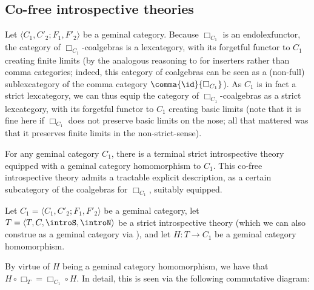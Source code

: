 
\subsection{Co-free introspective theories}

\begin{construction}\label{BoxCoalgebrasInGeminal}
Let $\langle C_1, C'_2; F_1, F'_2 \rangle$ be a geminal category. Because $\Box_{C_1}$ is an endolexfunctor, the category of $\Box_{C_1}$-coalgebras is a lexcategory, with its forgetful functor to $C_1$ creating finite limits (by the analogous reasoning to  for inserters rather than comma categories; indeed, this category of coalgebras can be seen as a (non-full) sublexcategory of the comma category $\comma{\id}{\Box_{C_1}}$). As $C_1$ is in fact a strict lexcategory, we can thus equip the category of $\Box_{C_1}$-coalgebras as a strict lexcategory, with its forgetful functor to $C_1$ creating basic limits (note that it is fine here if $\Box_{C_1}$ does not preserve basic limits on the nose; all that mattered was that it preserves finite limits in the non-strict-sense).
\end{construction}

\begin{construction}
For any geminal category $C_1$, there is a terminal strict introspective theory equipped with a geminal category homomorphism to $C_1$. This co-free introspective theory admits a tractable explicit description, as a certain subcategory of the coalgebras for $\Box_{C_1}$, suitably equipped.
\end{construction}
\openDetails
Let $C_1 = \langle C_1, C'_2; F_1, F'_2 \rangle$ be a geminal category, let $T = \langle T, C, \introS, \introN \rangle$ be a strict introspective theory (which we can also construe as a geminal category via ), and let $H : T \to C_1$ be a geminal category homomorphism.

By virtue of $H$ being a geminal category homomorphism, we have that $H \circ \Box_T = \Box_{C_1} \circ H$. In detail, this is seen via the following commutative diagram:

